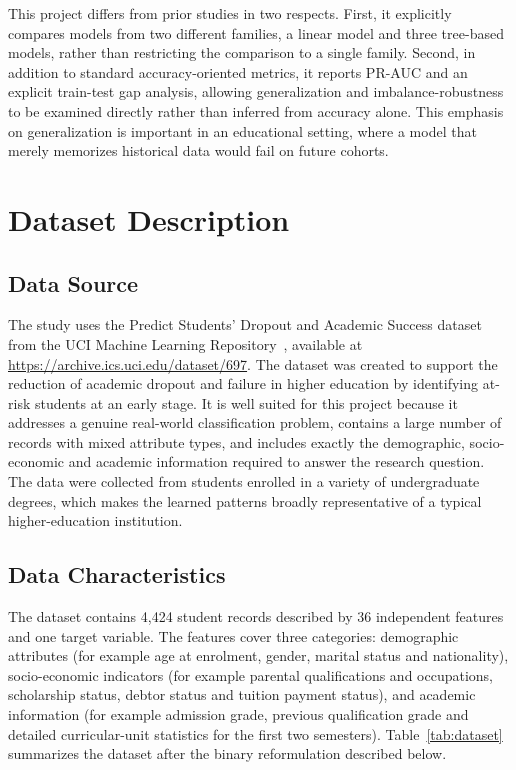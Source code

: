 \documentclass[conference]{IEEEtran}
\begin{document}
	This project differs from prior studies in two respects. First, it explicitly compares models from two different families, a linear model and three tree-based models, rather than restricting the comparison to a single family. Second, in addition to standard accuracy-oriented metrics, it reports PR-AUC and an explicit train-test gap analysis, allowing generalization and imbalance-robustness to be examined directly rather than inferred from accuracy alone. This emphasis on generalization is important in an educational setting, where a model that merely memorizes historical data would fail on future cohorts.
	
	\section{Dataset Description}
	\label{sec:dataset}
	
	\subsection{Data Source}
	The study uses the Predict Students' Dropout and Academic Success dataset from the UCI Machine Learning Repository~\cite{b3}, available at \url{https://archive.ics.uci.edu/dataset/697}. The dataset was created to support the reduction of academic dropout and failure in higher education by identifying at-risk students at an early stage. It is well suited for this project because it addresses a genuine real-world classification problem, contains a large number of records with mixed attribute types, and includes exactly the demographic, socio-economic and academic information required to answer the research question. The data were collected from students enrolled in a variety of undergraduate degrees, which makes the learned patterns broadly representative of a typical higher-education institution.
	
	\subsection{Data Characteristics}
	The dataset contains 4,424 student records described by 36 independent features and one target variable. The features cover three categories: demographic attributes (for example age at enrolment, gender, marital status and nationality), socio-economic indicators (for example parental qualifications and occupations, scholarship status, debtor status and tuition payment status), and academic information (for example admission grade, previous qualification grade and detailed curricular-unit statistics for the first two semesters). Table~\ref{tab:dataset} summarizes the dataset after the binary reformulation described below.
	
\end{document}
